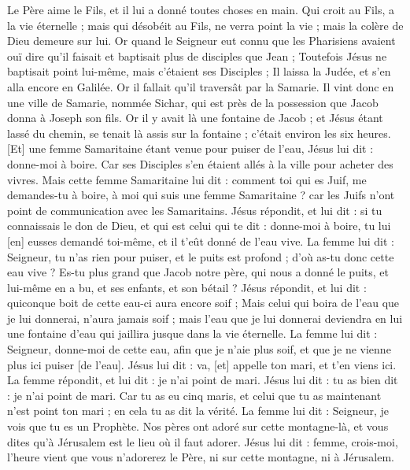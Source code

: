 \begin{multicols}{2}
Le Père aime le Fils, et il lui a donné toutes choses en main.
Qui croit au Fils, a la vie éternelle ; mais qui désobéit au Fils, ne verra point la vie ; mais la colère de Dieu demeure sur lui.
\VerseOne{}Or quand le Seigneur eut connu que les Pharisiens avaient ouï dire qu'il faisait et baptisait plus de disciples que Jean ;
Toutefois Jésus ne baptisait point lui-même, mais c'étaient ses Disciples ;
Il laissa la Judée, et s'en alla encore en Galilée.
Or il fallait qu'il traversât par la Samarie.
Il vint donc en une ville de Samarie, nommée Sichar, qui est près de la possession que Jacob donna à Joseph son fils.
Or il y avait là une fontaine de Jacob ; et Jésus étant lassé du chemin, se tenait là assis sur la fontaine ; c'était environ les six heures.
[Et] une femme Samaritaine étant venue pour puiser de l'eau, Jésus lui dit : donne-moi à boire.
Car ses Disciples s'en étaient allés à la ville pour acheter des vivres.
Mais cette femme Samaritaine lui dit : comment toi qui es Juif, me demandes-tu à boire, à moi qui suis une femme Samaritaine ? car les Juifs n'ont point de communication avec les Samaritains.
Jésus répondit, et lui dit : si tu connaissais le don de Dieu, et qui est celui qui te dit : donne-moi à boire, tu lui [en] eusses demandé toi-même, et il t'eût donné de l'eau vive.
La femme lui dit : Seigneur, tu n'as rien pour puiser, et le puits est profond ; d'où as-tu donc cette eau vive ?
Es-tu plus grand que Jacob notre père, qui nous a donné le puits, et lui-même en a bu, et ses enfants, et son bétail ?
Jésus répondit, et lui dit : quiconque boit de cette eau-ci aura encore soif ;
Mais celui qui boira de l'eau que je lui donnerai, n'aura jamais soif ; mais l'eau que je lui donnerai deviendra en lui une fontaine d'eau qui jaillira jusque dans la vie éternelle.
La femme lui dit : Seigneur, donne-moi de cette eau, afin que je n'aie plus soif, et que je ne vienne plus ici puiser [de l'eau].
Jésus lui dit : va, [et] appelle ton mari, et t'en viens ici.
La femme répondit, et lui dit : je n'ai point de mari. Jésus lui dit : tu as bien dit : je n'ai point de mari.
Car tu as eu cinq maris, et celui que tu as maintenant n'est point ton mari ; en cela tu as dit la vérité.
La femme lui dit : Seigneur, je vois que tu es un Prophète.
Nos pères ont adoré sur cette montagne-là, et vous dites qu'à Jérusalem est le lieu où il faut adorer.
Jésus lui dit : femme, crois-moi, l'heure vient que vous n'adorerez le Père, ni sur cette montagne, ni à Jérusalem.

\end{multicols}
